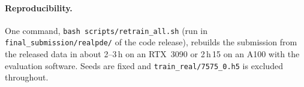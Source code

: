 \documentclass[10pt]{article}
\begin{document}
\paragraph{Reproducibility.} One command, \texttt{bash scripts/retrain\_all.sh} (run in \texttt{final\_submission/realpde/} of the code
release), rebuilds the submission
from the released data in about 2--3\,h on an RTX~3090 or 2\,h\,15 on an A100 with the evaluation software. Seeds
are fixed and \texttt{train\_real/7575\_0.h5} is excluded throughout.
\end{document}
